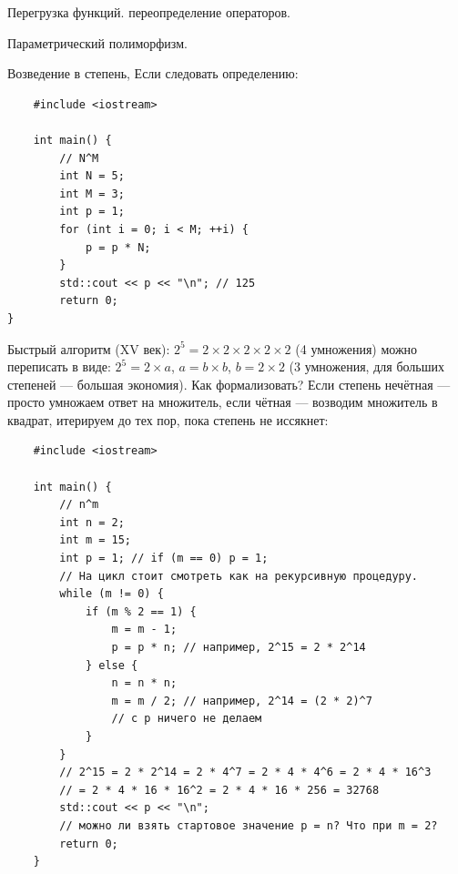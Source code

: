 \documentclass{book}
\begin{document}
Перегрузка функций. переопределение операторов.

Параметрический полиморфизм.

Возведение в степень, Если следовать определению:
\begin{verbatim}
    #include <iostream>

    int main() {
        // N^M
        int N = 5;
        int M = 3;
        int p = 1;
        for (int i = 0; i < M; ++i) {
            p = p * N;
        }
        std::cout << p << "\n"; // 125
        return 0;
}
\end{verbatim}

Быстрый алгоритм (XV век): $2^5 = 2 \times 2 \times 2 \times 2 \times 2$ (4 умножения) можно
переписать в виде: $2^5 = 2 \times a$, $a = b \times b$, $b = 2 \times 2$ (3 умножения, для больших
степеней --- большая экономия). Как формализовать? Если степень нечётная --- просто умножаем ответ
на множитель, если чётная --- возводим множитель в квадрат, итерируем до тех пор, пока степень не
иссякнет:
\begin{verbatim}
    #include <iostream>

    int main() {
        // n^m
        int n = 2;
        int m = 15;
        int p = 1; // if (m == 0) p = 1;
        // На цикл стоит смотреть как на рекурсивную процедуру.
        while (m != 0) {
            if (m % 2 == 1) {
                m = m - 1;
                p = p * n; // например, 2^15 = 2 * 2^14
            } else {
                n = n * n;
                m = m / 2; // например, 2^14 = (2 * 2)^7
                // с p ничего не делаем
            }
        }
        // 2^15 = 2 * 2^14 = 2 * 4^7 = 2 * 4 * 4^6 = 2 * 4 * 16^3
        // = 2 * 4 * 16 * 16^2 = 2 * 4 * 16 * 256 = 32768
        std::cout << p << "\n";
        // можно ли взять стартовое значение p = n? Что при m = 2?
        return 0;
    }
\end{verbatim}
\end{document}
